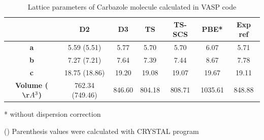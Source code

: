  	
 		\begin{table}[H]
 			\caption{Lattice parameters of Carbazole molecule calculated in VASP code}  \label{table-carbazolesol}
 			\begin{center}
 				\begin{threeparttable}
 					\begin{tabular}{c c c c c c c}
 						\toprule
 						& \textbf{D2} & \textbf{D3} & \textbf{TS} & \textbf{TS-SCS} & \textbf{PBE*} & \textbf{Exp} ref\cite{belskii1985structure} \\
 						\midrule
 						\textbf{a} & 5.59 (5.51) & 5.77 & 5.70 & 5.70 & 6.07 & 5.71 \\
 						\textbf{b}& 7.27 (7.21) & 7.64 & 7.39 & 7.44 & 8.67 & 7.78\\
 						\textbf{c}& 18.75 (18.86) & 19.20 & 19.08 & 19.07 & 19.67 & 19.11\\
 						\textbf{Volume ($\AA^{3}$)}& 762.34 (749.46) & 846.60 & 804.18 & 808.71 & 1035.61 & 848.88\\
 						\bottomrule
 					\end{tabular}
 					
 					\begin{tablenotes}
 						\item[*] without dispersion correction
 						\item[()] Parenthesis values were calculated with CRYSTAL program
 					\end{tablenotes}
 				\end{threeparttable}
 			\end{center}
 		\end{table}
 
